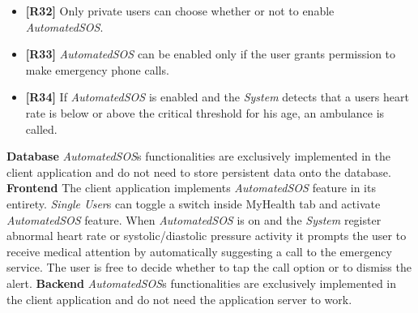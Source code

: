 \documentclass[titlepage]{article}
\begin{document}
	\begin{itemize}
		\item {\bf [R32]} Only private users can choose whether or not to enable {\it AutomatedSOS}. 
		\item {\bf [R33]} {\it AutomatedSOS} can be enabled only if the user grants permission to make emergency phone calls. 
		\item {\bf [R34]} If {\it AutomatedSOS} is enabled and the {\it System} detects that a user\textsc{}s heart rate is below or above the critical threshold for his age, an ambulance is called. 
	\end{itemize}
	\noindent
	{\bf Database} \newline
	{\it AutomatedSOS}\textsc{}s functionalities are exclusively implemented in the client application and do not need to store persistent data onto the database.
	\newline
	\newline
	\noindent
	{\bf Frontend} \newline
	The client application implements {\it AutomatedSOS} feature in its entirety. {\it Single User}s can toggle a switch inside MyHealth tab and activate {\it AutomatedSOS} feature. When {\it AutomatedSOS} is on and the {\it System} register abnormal heart rate or systolic/diastolic pressure activity it prompts the user to receive medical attention by automatically suggesting a call to the emergency service. The user is free to decide whether to tap the call option or to dismiss the alert.
	\newline
	\newline
	\noindent
	{\bf Backend} \newline
	{\it AutomatedSOS}\textsc{}s functionalities are exclusively implemented in the client application and do not need the application server to work.
	
	
\end{document}
